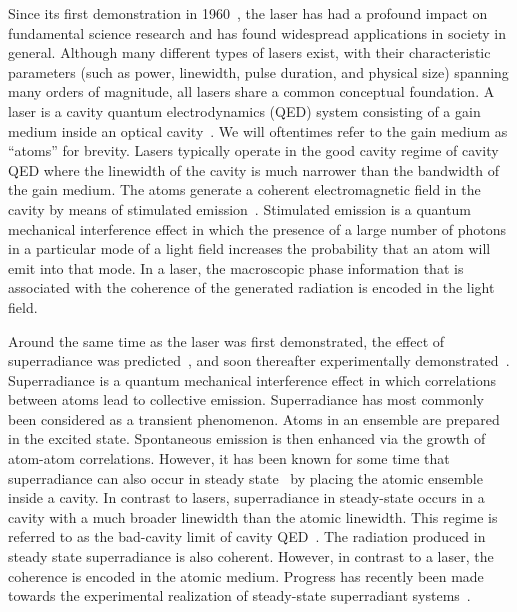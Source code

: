 \documentclass[aps,
twocolumn,
showpacs,
superscriptaddress,groupedaddress]{revtex4}
\begin{document}
Since its first demonstration in 1960~\cite{maiman1960stimulated}, the
laser has had a profound impact on fundamental science research and has
found widespread applications in society in general.  Although many
different types of lasers exist, with their characteristic parameters
(such as power, linewidth, pulse duration, and physical size) spanning
many orders of magnitude, all lasers share a common conceptual
foundation.  A laser is a cavity quantum electrodynamics (QED) system
consisting of a gain medium inside an optical
cavity~\cite{meystre2007elements}.  We will oftentimes refer to the gain
medium as ``atoms'' for brevity.  Lasers typically operate in the good
cavity regime of cavity QED where the linewidth of the cavity is much
narrower than the bandwidth of the gain medium.  The atoms generate a
coherent electromagnetic field in the cavity by means of stimulated
emission~\cite{PhysRev.112.1940}.  Stimulated emission is a quantum
mechanical interference effect in which the presence of a large number
of photons in a particular mode of a light field increases the
probability that an atom will emit into that mode. In a laser, the
macroscopic phase information that is associated with the coherence of
the generated radiation is encoded in the light field.

Around the same time as the laser was first demonstrated, the effect
of superradiance was predicted~\cite{PhysRev.93.99}, and soon
thereafter experimentally demonstrated~\cite{harocheSuperradiance}.
Superradiance is a quantum mechanical interference effect in which
correlations between atoms lead to collective emission.  Superradiance
has most commonly been considered as a transient phenomenon.  Atoms in
an ensemble are prepared in the excited state.  Spontaneous emission
is then enhanced via the growth of atom-atom correlations.  However,
it has been known for some time that superradiance can also occur in
steady state~\cite{PhysRevLett.102.163601, PhysRevA.81.033847,
  PhysRevA.81.063827,PhysRevLett.89.253003} by placing the atomic
ensemble inside a cavity.  In contrast to lasers, superradiance in
steady-state occurs in a cavity with a much broader linewidth than the
atomic linewidth.  This regime is referred to as the bad-cavity limit
of cavity QED~\cite{PhysRevA.51.809, PhysRevLett.72.3815,
  ChenDeliciousLaser, HakenLaser, HakenLaserBook}.  The radiation
produced in steady state superradiance is also coherent.  However, in
contrast to a laser, the coherence is encoded in the atomic medium.
Progress has recently been made towards the experimental realization
of steady-state superradiant
systems~\cite{ThompsonPaper,bohnet2012relaxation,Norcia:Crossover}.
\end{document}
